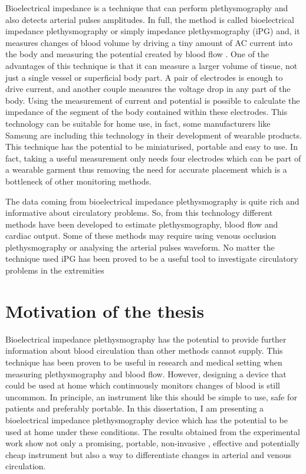 Bioelectrical impedance is a technique that can perform plethysmography and also detects arterial pulses amplitudes. In full, the method is called bioelectrical impedance plethysmography or simply impedance plethysmography (iPG) and, it measures changes of blood volume by driving a tiny amount of AC current into the body and measuring the potential created by blood flow \cite{bera2014bioelectrical}. One of the advantages of this technique is that it can measure a larger volume of tissue, not just a single vessel or superficial body part. A pair of electrodes is enough to drive current, and another couple measures the voltage drop in any part of the body. Using the measurement of current and potential is possible to calculate the impedance of the segment of the body contained within these electrodes. This technology can be suitable for home use, in fact, some manufacturers like Samsung \cite{simsense} are including this technology in their development of wearable products. This technique has the potential to be miniaturised, portable and easy to use. In fact, taking a useful measurement only needs four electrodes which can be part of a wearable garment thus removing the need for accurate placement which is a bottleneck of other monitoring methods.

The data coming from bioelectrical impedance plethysmography is quite rich and informative about circulatory problems. So, from this technology different methods have been developed to estimate plethysmography, blood flow and cardiac output. Some of these methods may require using venous occlusion plethysmography or analysing the arterial pulses waveform. No matter the technique used iPG has been proved to be a useful tool to investigate circulatory problems in the extremities \cite{bera2014bioelectrical, nyboer1974blood, mohapatra1979measurement, kyle2004bioelectrical, costeloe1980continuous, yamakoshi1980limb, porter1985measurement, corciova2011peripheral}

\section{Motivation of the thesis}
Bioelectrical impedance plethysmography has the potential to provide further information about blood circulation than other methods cannot supply. This technique has been proven to be useful in research and medical setting when measuring plethysmography and blood flow. However, designing a device that could be used at home which continuously monitors changes of blood is still uncommon. In principle, an instrument like this should be simple to use, safe for patients and preferably portable. In this dissertation, I am presenting a bioelectrical impedance plethysmography device which has the potential to be used at home under these conditions. The results obtained from the experimental work show not only a promising, portable, non-invasive , effective and potentially cheap instrument but also a way to differentiate changes in arterial and venous circulation.   

